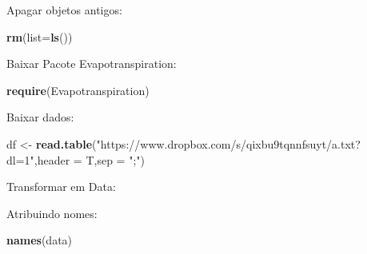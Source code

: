 \documentclass[
]{book}
\newenvironment{Shaded}{\begin{snugshade}}{\end{snugshade}}
\newcommand{\DataTypeTok}[1]{\textcolor[rgb]{0.13,0.29,0.53}{#1}}
\newcommand{\DecValTok}[1]{\textcolor[rgb]{0.00,0.00,0.81}{#1}}
\newcommand{\KeywordTok}[1]{\textcolor[rgb]{0.13,0.29,0.53}{\textbf{#1}}}
\newcommand{\NormalTok}[1]{#1}
\newcommand{\OperatorTok}[1]{\textcolor[rgb]{0.81,0.36,0.00}{\textbf{#1}}}
\newcommand{\StringTok}[1]{\textcolor[rgb]{0.31,0.60,0.02}{#1}}
\begin{document}
Apagar objetos antigos:

\begin{Shaded}
\begin{Highlighting}[]
\KeywordTok{rm}\NormalTok{(}\DataTypeTok{list=}\KeywordTok{ls}\NormalTok{())}
\end{Highlighting}
\end{Shaded}

Baixar Pacote Evapotranspiration:

\begin{Shaded}
\begin{Highlighting}[]
\KeywordTok{require}\NormalTok{(Evapotranspiration)}
\end{Highlighting}
\end{Shaded}

Baixar dados:

\begin{Shaded}
\begin{Highlighting}[]
\NormalTok{df <-}\StringTok{ }\KeywordTok{read.table}\NormalTok{(}\StringTok{"https://www.dropbox.com/s/qixbu9tqnnfsuyt/a.txt?dl=1"}\NormalTok{,}\DataTypeTok{header =}\NormalTok{ T,}\DataTypeTok{sep =} \StringTok{";"}\NormalTok{)}
\end{Highlighting}
\end{Shaded}

Transformar em Data:

\begin{Shaded}
\end{Shaded}

Atribuindo nomes:

\begin{Shaded}
\begin{Highlighting}[]
\KeywordTok{names}\NormalTok{(data)}
\end{Highlighting}
\end{Shaded}
\end{document}
